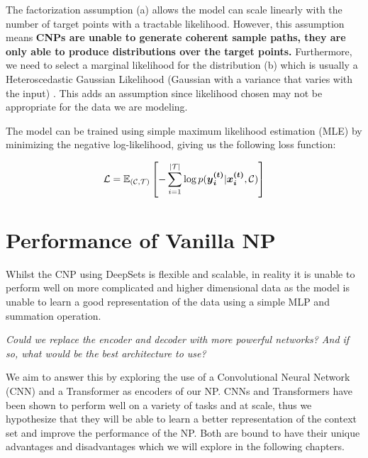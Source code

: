 \documentclass[../../main.tex]{subfiles}
\begin{document}
The  factorization assumption (a) allows the model can scale linearly with the number of target points with a tractable likelihood. However, this assumption means
\textbf{CNPs are unable to generate coherent sample paths, they are only able to produce distributions over the target points.} Furthermore, we need to select a marginal likelihood for the distribution (b) which is usually a Heteroscedastic Gaussian Likelihood (Gaussian with a variance that varies with the input) \cite{garnelo2018conditional}. This adds an assumption since likelihood chosen may not be appropriate for the data we are modeling.

The model can be trained using simple maximum likelihood estimation (MLE) by minimizing the negative log-likelihood, giving us the following loss function:

\begin{equation}
    \mathcal{L} = \mathbb{E}_{(\mathcal{C}, \mathcal{T})} \left[- \sum_{i=1}^{|\mathcal{T}|} \log p(\bm{{y}_i^{(t)}} | \bm{{x}_i^{(t)}}, \mathcal{C})\right]
\end{equation}




\section{Performance of Vanilla NP}

Whilst the CNP using DeepSets is flexible and scalable, in reality it is unable to perform well on more complicated and higher dimensional data as the model is unable to learn a good representation of the data using a simple MLP and summation operation. 

\emph{Could we replace the encoder and decoder with more powerful networks? And if so, what would be the best architecture to use?} 

We aim to answer this by exploring the use of a Convolutional Neural Network (CNN) and a Transformer as encoders of our NP. CNNs and Transformers have been shown to perform well on a variety of tasks and at scale, thus we hypothesize that they will be able to learn a better representation of the context set and improve the performance of the NP.
Both are bound to have their unique advantages and disadvantages which we will explore in the following chapters.



\end{document}
